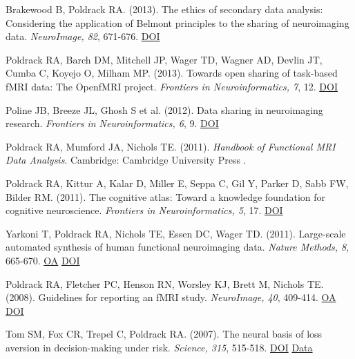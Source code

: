 \documentclass[10pt, letterpaper]{article}
\begin{document}
Brakewood B, Poldrack RA.  (2013). The ethics of secondary data analysis: Considering the application of Belmont principles to the sharing of neuroimaging data. \textit{NeuroImage, 82}, 671-676. \href{https://doi.org/10.1016/j.neuroimage.2013.02.040}{DOI} \vspace{2mm}

Poldrack RA, Barch DM, Mitchell JP, Wager TD, Wagner AD, Devlin JT, Cumba C, Koyejo O, Milham MP.  (2013). Towards open sharing of task-based fMRI data: The OpenfMRI project. \textit{Frontiers in Neuroinformatics, 7}, 12. \href{https://doi.org/10.3389/fninf.2013.00012}{DOI} \vspace{2mm}

Poline JB, Breeze JL, Ghosh S et al. (2012). Data sharing in neuroimaging research. \textit{Frontiers in Neuroinformatics, 6}, 9. \href{https://doi.org/10.3389/fninf.2012.00009}{DOI} \vspace{2mm}

Poldrack RA, Mumford JA, Nichols TE.  (2011).  \textit{Handbook of Functional MRI Data Analysis}. Cambridge: Cambridge University Press .\vspace{2mm}

Poldrack RA, Kittur A, Kalar D, Miller E, Seppa C, Gil Y, Parker D, Sabb FW, Bilder RM.  (2011). The cognitive atlas: Toward a knowledge foundation for cognitive neuroscience. \textit{Frontiers in Neuroinformatics, 5}, 17. \href{https://doi.org/10.3389/fninf.2011.00017}{DOI} \vspace{2mm}

Yarkoni T, Poldrack RA, Nichols TE, Essen DC, Wager TD.  (2011). Large-scale automated synthesis of human functional neuroimaging data. \textit{Nature Methods, 8}, 665-670. \href{https://www.ncbi.nlm.nih.gov/pmc/articles/PMC3146590}{OA} \href{https://doi.org/10.1038/nmeth.1635}{DOI} \vspace{2mm}

Poldrack RA, Fletcher PC, Henson RN, Worsley KJ, Brett M, Nichols TE.  (2008). Guidelines for reporting an fMRI study. \textit{NeuroImage, 40}, 409-414. \href{https://www.ncbi.nlm.nih.gov/pmc/articles/PMC2287206}{OA} \href{https://doi.org/10.1016/j.neuroimage.2007.11.048}{DOI} \vspace{2mm}

Tom SM, Fox CR, Trepel C, Poldrack RA.  (2007). The neural basis of loss aversion in decision-making under risk. \textit{Science, 315}, 515-518. \href{https://doi.org/10.1126/science.1134239}{DOI} \href{https://openneuro.org/datasets/ds000008/versions/00001}{Data} \vspace{2mm}
\end{document}
